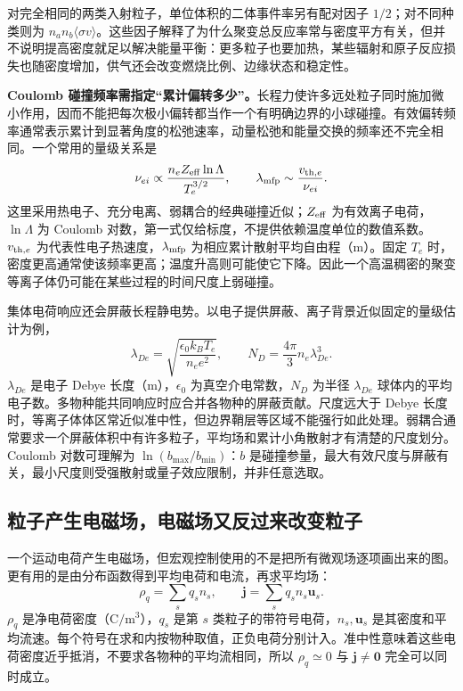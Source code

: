 \documentclass[12pt,fontset=none]{ctexart}
\numberwithin{equation}{section}
\numberwithin{table}{section}
\numberwithin{figure}{section}
\begin{document}
对完全相同的两类入射粒子，单位体积的二体事件率另有配对因子 $1/2$；对不同种类则为 $n_an_b\langle\sigma v\rangle$。这些因子解释了为什么聚变总反应率常与密度平方有关，但并不说明提高密度就足以解决能量平衡：更多粒子也要加热，某些辐射和原子反应损失也随密度增加，供气还会改变燃烧比例、边缘状态和稳定性。

\textbf{Coulomb 碰撞频率需指定``累计偏转多少''。}长程力使许多远处粒子同时施加微小作用，因而不能把每次极小偏转都当作一个有明确边界的小球碰撞。有效偏转频率通常表示累计到显著角度的松弛速率，动量松弛和能量交换的频率还不完全相同。一个常用的量级关系是
\begin{equation}\label{eq:micro-coulomb-scaling}
 \nu_{ei}\propto
 \frac{n_e Z_{\rm eff}\ln\Lambda}{T_e^{3/2}},\qquad
 \lambda_{\rm mfp}\sim\frac{v_{{\rm th},e}}{\nu_{ei}}.
\end{equation}
这里采用热电子、充分电离、弱耦合的经典碰撞近似；$Z_{\rm eff}$ 为有效离子电荷，$\ln\Lambda$ 为 Coulomb 对数，第一式仅给标度，不提供依赖温度单位的数值系数。$v_{{\rm th},e}$ 为代表性电子热速度，$\lambda_{\rm mfp}$ 为相应累计散射平均自由程（m）。固定 $T_e$ 时，密度更高通常使该频率更高；温度升高则可能使它下降。因此一个高温稠密的聚变等离子体仍可能在某些过程的时间尺度上弱碰撞\cite{Pcollisions}。

集体电荷响应还会屏蔽长程静电势。以电子提供屏蔽、离子背景近似固定的量级估计为例，
\begin{equation}\label{eq:micro-debye}
 \lambda_{De}=\sqrt{\frac{\epsilon_0k_BT_e}{n_ee^2}},\qquad
 N_D=\frac{4\pi}{3}n_e\lambda_{De}^3.
\end{equation}
$\lambda_{De}$ 是电子 Debye 长度（m），$\epsilon_0$ 为真空介电常数，$N_D$ 为半径 $\lambda_{De}$ 球体内的平均电子数。多物种能共同响应时应合并各物种的屏蔽贡献。尺度远大于 Debye 长度时，等离子体体区常近似准中性，但边界鞘层等区域不能强行如此处理。弱耦合通常要求一个屏蔽体积中有许多粒子，平均场和累计小角散射才有清楚的尺度划分。Coulomb 对数可理解为 $\ln(b_{\max}/b_{\min})$：$b$ 是碰撞参量，最大有效尺度与屏蔽有关，最小尺度则受强散射或量子效应限制，并非任意选取。

\subsection{粒子产生电磁场，电磁场又反过来改变粒子}\label{sec:micro-selfconsistent}

一个运动电荷产生电磁场，但宏观控制使用的不是把所有微观场逐项画出来的图。更有用的是由分布函数得到平均电荷和电流，再求平均场：
\begin{equation}\label{eq:micro-sources}
 \rho_q=\sum_s q_sn_s,\qquad
 \bm j=\sum_s q_sn_s\bm u_s.
\end{equation}
$\rho_q$ 是净电荷密度（$\mathrm{C/m^3}$），$q_s$ 是第 $s$ 类粒子的带符号电荷，$n_s,\bm u_s$ 是其密度和平均流速。每个符号在求和内按物种取值，正负电荷分别计入。准中性意味着这些电荷密度近乎抵消，不要求各物种的平均流相同，所以 $\rho_q\simeq0$ 与 $\bm j\neq\bm0$ 完全可以同时成立。
\end{document}
